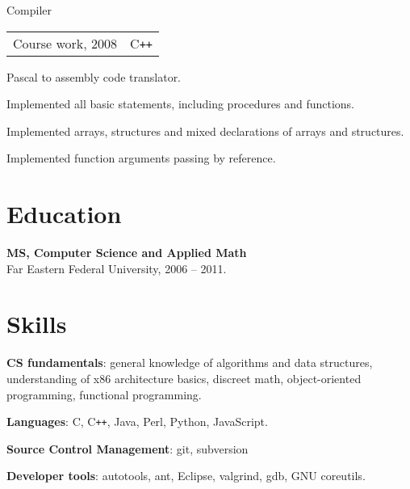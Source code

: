 \documentclass[a4paper]{article}
\begin{document}
\begin{multicols}{2}
		\begin{project}{Compiler}{\begin{tabular}{@{}l|l}Course work, 2008 & C\texttt{++}\\\end{tabular}}
			Pascal to assembly code translator.
			\begin{items}
				\item Implemented all basic statements, including procedures and functions.
				\item Implemented arrays, structures and mixed declarations of arrays and structures.
				\item Implemented function arguments passing by reference.
			\end{items}
		\end{project}
	\end{multicols}

	\section{Education}
		\begin{multicols}{2}
			\raggedcolumns
			\begin{items}
				\item \textbf{MS, Computer Science and Applied Math}\\
				Far Eastern Federal University, 2006 -- 2011.
			\end{items}
			\columnbreak
			\hspace{10mm}
		\end{multicols}

	\section{Skills}
	\begin{multicols}{2}
		\raggedcolumns
		\begin{items}
			\item \textbf{CS fundamentals}: general knowledge of algorithms and data structures, understanding of x86 architecture basics, discreet math, object-oriented programming, functional programming.
			\item \textbf{Languages}: C, C\texttt{++}, Java, Perl, Python, JavaScript.
			\columnbreak
			\item \textbf{Source Control Management}: git, subversion
			\item \textbf{Developer tools}: autotools, ant, Eclipse, valgrind, gdb, GNU coreutils.
		\end{items}
	\end{multicols}
\end{document}
